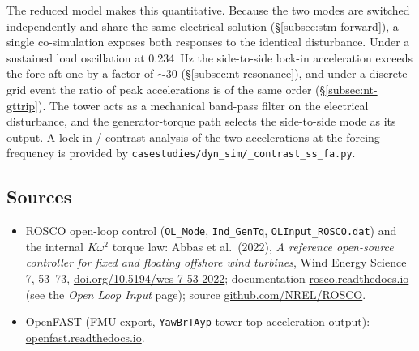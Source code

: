 The reduced model makes this quantitative. Because the two modes are switched
independently and share the same electrical solution
(\S\ref{subsec:stm-forward}), a single co-simulation exposes both responses to
the identical disturbance. Under a sustained load oscillation at
\SI{0.234}{\hertz} the side-to-side lock-in acceleration exceeds the fore-aft one
by a factor of \(\sim 30\) (\S\ref{subsec:nt-resonance}), and under a discrete
grid event the ratio of peak accelerations is of the same order
(\S\ref{subsec:nt-gttrip}). The tower acts as a mechanical band-pass filter on
the electrical disturbance, and the generator-torque path selects the
side-to-side mode as its output. A lock-in / contrast analysis of the two
accelerations at the forcing frequency is provided by
\texttt{casestudies/dyn\_sim/\_contrast\_ss\_fa.py}.

\subsection*{Sources}
\label{subsec:se-sources}

\begin{itemize}
  \item ROSCO open-loop control (\texttt{OL\_Mode}, \texttt{Ind\_GenTq},
        \texttt{OLInput\_ROSCO.dat}) and the internal \(K\omega^2\) torque law:
        Abbas et al.\ (2022), \emph{A reference open-source controller for fixed
        and floating offshore wind turbines}, Wind Energy Science 7, 53--73,
        \href{https://doi.org/10.5194/wes-7-53-2022}{doi.org/10.5194/wes-7-53-2022};
        documentation \href{https://rosco.readthedocs.io/}{rosco.readthedocs.io}
        (see the \emph{Open Loop Input} page); source
        \href{https://github.com/NREL/ROSCO}{github.com/NREL/ROSCO}.
  \item OpenFAST (FMU export, \texttt{YawBrTAyp} tower-top acceleration output):
        \href{https://openfast.readthedocs.io/}{openfast.readthedocs.io}.
\end{itemize}
